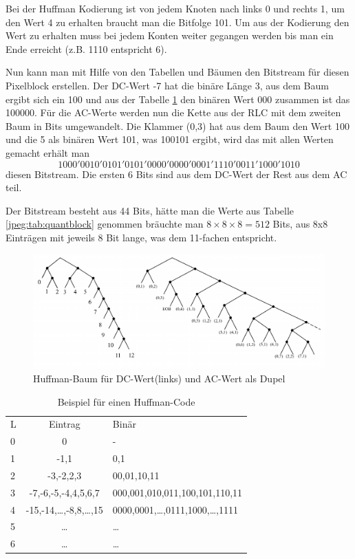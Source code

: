 Bei der Huffman Kodierung ist von jedem Knoten nach links 0 und rechts 1, um den Wert 4 zu erhalten braucht man die Bitfolge 101.
Um aus der Kodierung den Wert zu erhalten muss bei jedem Konten weiter gegangen werden bis man ein Ende erreicht (z.B. 1110 entspricht 6).

Nun kann man mit Hilfe von den Tabellen und Bäumen den Bitstream für diesen Pixelblock erstellen.
Der DC-Wert -7 hat die binäre Länge 3, aus dem Baum ergibt sich ein 100 und aus der Tabelle \ref{jpeg:tab:huffman} den binären Wert 000 zusammen ist das 100000.
Für die AC-Werte werden nun die Kette aus der RLC mit dem zweiten Baum in Bits umgewandelt.
Die Klammer (0,3) hat aus dem Baum den Wert 100 und die 5 als binären Wert 101, was 100101 ergibt, wird das mit allen Werten gemacht erhält man
\begin{equation}
    1000'0010'0101'0101'0000'0000'0001'1110'0011'1000'1010    
\end{equation}
diesen Bitstream.
Die ersten 6 Bits sind aus dem DC-Wert der Rest aus dem AC teil.

Der Bitstream besteht aus 44 Bits, hätte man die Werte aus Tabelle \ref{jpeg:tab:quantblock} genommen bräuchte man \(8\times8\times8=512\) Bits, aus 8x8 Einträgen mit jeweils 8 Bit lange, was dem 11-fachen entspricht.
 

\begin{figure}
    \centering
    \includegraphics[width=\textwidth]{papers/jpeg/pictures/huffman.pdf}
    \caption{Huffman-Baum für DC-Wert(links) und AC-Wert als Dupel 
        \label{jpeg:fig:huffman}}
\end{figure}

\begin{table}[b]
    \centering
    \begin{tabular}{lcl}
        L & Eintrag                     & Binär\\
        0 & 0                           & - \\
        1 & -1,1                        & 0,1 \\
        2 & -3,-2,2,3                   & 00,01,10,11 \\
        3 & -7,-6,-5,-4,4,5,6,7         & 000,001,010,011,100,101,110,11 \\
        4 & -15,-14,\dots,-8,8,\dots,15 & 0000,0001,\dots,0111,1000,\dots,1111 \\
        5 & \dots                       & \dots \\
        6 & \dots                       & \dots                           
    \end{tabular}
    \caption{Beispiel für einen Huffman-Code
        \label{jpeg:tab:huffman}}
\end{table}
